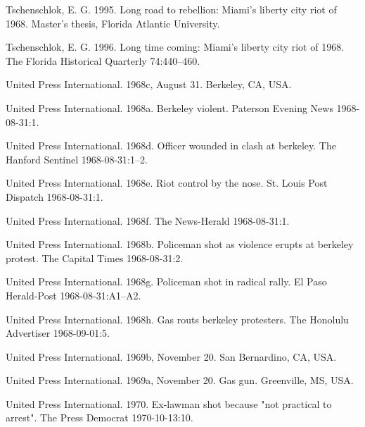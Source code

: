 \documentclass[
  11pt,
]{krantz}
\newlength{\cslhangindent}
\newlength{\cslentryspacingunit} %
\newenvironment{CSLReferences}[2] %
 {%
  \setlength{\parindent}{0pt}
  \ifodd #1
  \let\oldpar\par
  \def\par{\hangindent=\cslhangindent\oldpar}
  \fi
  \setlength{\parskip}{#2\cslentryspacingunit}
 }%
 {}
\begin{document}
\begin{CSLReferences}{1}{0}
\leavevmode{}%
Tschenschlok, E. G. 1995. Long road to rebellion: Miami's liberty city riot of 1968. Master's thesis, Florida Atlantic University.

\leavevmode{}%
Tschenschlok, E. G. 1996. Long time coming: Miami's liberty city riot of 1968. The Florida Historical Quarterly 74:440--460.

\leavevmode{}%
United Press International. 1968c, August 31. Berkeley, CA, USA.

\leavevmode{}%
United Press International. 1968a. Berkeley violent. Paterson Evening News 1968-08-31:1.

\leavevmode{}%
United Press International. 1968d. Officer wounded in clash at berkeley. The Hanford Sentinel 1968-08-31:1--2.

\leavevmode{}%
United Press International. 1968e. Riot control by the nose. St. Louis Post Dispatch 1968-08-31:1.

\leavevmode{}%
United Press International. 1968f. The News-Herald 1968-08-31:1.

\leavevmode{}%
United Press International. 1968b. Policeman shot as violence erupts at berkeley protest. The Capital Times 1968-08-31:2.

\leavevmode{}%
United Press International. 1968g. Policeman shot in radical rally. El Paso Herald-Post 1968-08-31:A1--A2.

\leavevmode{}%
United Press International. 1968h. Gas routs berkeley protesters. The Honolulu Advertiser 1968-09-01:5.

\leavevmode{}%
United Press International. 1969b, November 20. San Bernardino, CA, USA.

\leavevmode{}%
United Press International. 1969a, November 20. Gas gun. Greenville, MS, USA.

\leavevmode{}%
United Press International. 1970. Ex-lawman shot because "not practical to arrest". The Press Democrat 1970-10-13:10.


\end{CSLReferences}
\end{document}
